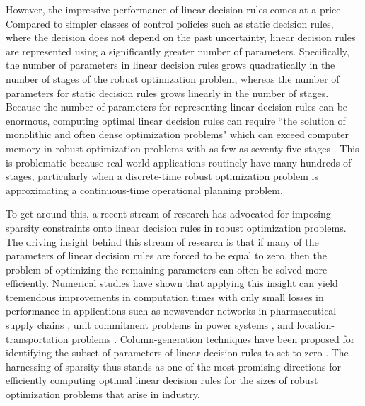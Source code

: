 \documentclass[nonblindrev,mnsc]{informs3} %
\begin{document}
  
  However, the impressive performance of linear decision rules comes at a price. 
Compared to simpler classes of control policies such as {static decision rules}, where the decision does not depend on the past uncertainty,  linear decision rules are represented using a significantly greater number of parameters. Specifically,  the number of parameters in linear decision rules grows {{quadratically}} in the number of stages of the robust optimization problem, whereas the number of parameters for static decision rules grows {{linearly}} in the number of stages. 
Because the number of parameters for representing linear decision rules can be enormous, computing  optimal linear decision rules can require  ``the solution of monolithic and often dense optimization problems" \citep[p.814]{georghiou2019robust} which can exceed computer memory in robust optimization problems with as few as seventy-five stages \citep[p.827]{georghiou2019robust}.  
   This is problematic  because real-world applications routinely have many hundreds of stages, particularly  when a discrete-time robust optimization problem is approximating a continuous-time operational planning problem.
   



To get around this, a recent stream of  research has advocated  for imposing {sparsity constraints} onto linear decision rules in robust optimization problems. The driving insight behind this stream of  research
is that if many of the parameters of linear decision rules are forced to be equal to zero, then the problem of optimizing the remaining parameters can often be solved more efficiently. Numerical studies have shown that applying this insight can yield  tremendous improvements in computation times with only small losses in performance in applications such as  newsvendor networks in pharmaceutical  supply chains \cite[\S 4]{bandi2019sustainable},  unit commitment problems in power systems \cite[\S 4.3]{lorca2016multistage}, and location-transportation problems \cite{ardestani2018value}. Column-generation techniques have been proposed for identifying the subset of parameters of linear decision rules to set to zero \cite{delage2021column}. The harnessing of sparsity thus stands as one of the most promising directions  for efficiently computing optimal linear decision rules for the sizes of robust optimization problems that arise in industry.  
\end{document}
